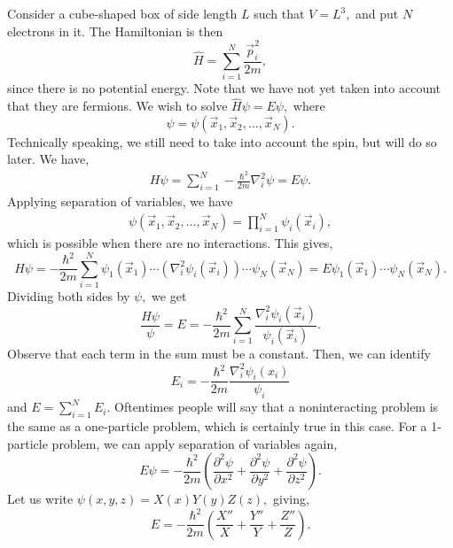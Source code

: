 \documentclass{article}
\numberwithin{equation}{section}
\begin{document}
Consider a cube-shaped box of side length $L$ such that $V=L^3,$ and put $N$ electrons in it. The Hamiltonian is then 
\begin{equation*}
    \hat{H} = \sum_{i=1}^N \frac{\vec{p}_i^2}{2m},
\end{equation*}
since there is no potential energy. Note that we have not yet taken into account that they are fermions. We wish to solve $\hat{H}\psi = E\psi,$ where 
\begin{equation*}
    \psi = \psi(\vec{x}_1,\vec{x}_2,\dots,\vec{x}_N).
\end{equation*}
Technically speaking, we still need to take into account the spin, but will do so later. We have,
\begin{align*}
    H\psi = \sum_{i=1}^N -\frac{\hbar^2}{2m}\nabla_i^2 \psi = E\psi.
\end{align*}
Applying separation of variables, we have
\begin{align*}
    \psi(\vec{x}_1,\vec{x}_2,\dots,\vec{x}_N) = \prod_{i=1}^N \psi_i(\vec{x}_i),
\end{align*}
which is possible when there are no interactions. This gives,
\begin{equation*}
    H\psi = -\frac{\hbar^2}{2m}\sum_{i=1}^{N}\psi_1(\vec{x}_1)\cdots (\nabla_i^2 \psi_i(\vec{x}_i)) \cdots \psi_N(\vec{x}_N) = E\psi_1(\vec{x}_1)\cdots \psi_N(\vec{x}_N).
\end{equation*}
Dividing both sides by $\psi,$ we get 
\begin{equation*}
    \frac{H\psi}{\psi} = E = -\frac{\hbar^2}{2m} \sum_{i=1}^N \frac{\nabla_i^2 \psi_i(\vec{x}_i)}{\psi_i(\vec{x}_i)}.
\end{equation*}
Observe that each term in the sum must be a constant. Then, we can identify 
\begin{equation*}
    E_i = -\frac{\hbar^2}{2m}\frac{\nabla_i^2\psi_i(x_i)}{\psi_i}
\end{equation*}
and $E = \sum_{i=1}^N E_i.$ Oftentimes people will say that a noninteracting problem is the same as a one-particle problem, which is certainly true in this case. For a 1-particle problem, we can apply separation of variables again,
\begin{equation*}
    E\psi = -\frac{\hbar^2}{2m} \left(\frac{\partial^2\psi}{\partial x^2} + \frac{\partial^2\psi}{\partial y^2} + \frac{\partial^2\psi}{\partial z^2}\right). 
\end{equation*}
Let us write $\psi(x,y,z)=X(x)Y(y)Z(z),$ giving,
\begin{equation*}
    E = -\frac{\hbar^2}{2m}\left( \frac{X''}{X} + \frac{Y''}{Y} + \frac{Z''}{Z}\right).
\end{equation*}
\end{document}
